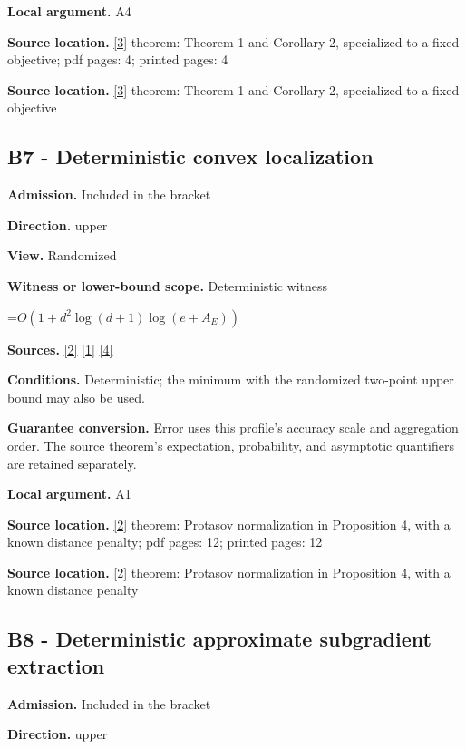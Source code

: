 \documentclass[10pt,a4paper]{article}
\newcommand{\AtlasMath}[1]{\par\begingroup\centering\setbox0=\hbox{$\displaystyle #1$}\ifdim\wd0>1.4\linewidth\typeout{ATLAS WIDE FORMULA: \the\wd0}\fi\ifdim\wd0>\linewidth\resizebox{\linewidth}{!}{\box0}\else\box0\fi\par\endgroup}
\begin{document}
\textbf{Local argument.} A4

\textbf{Source location.} \href{https://jmlr.org/papers/volume18/16-632/16-632.pdf}{[3]} theorem: Theorem 1 and Corollary 2, specialized to a fixed objective; pdf pages: 4; printed pages: 4

\textbf{Source location.} \href{https://jmlr.org/papers/volume18/16-632/16-632.pdf}{[3]} theorem: Theorem 1 and Corollary 2, specialized to a fixed objective

\subsection{B7 - Deterministic convex localization}
\textbf{Admission.} Included in the bracket

\textbf{Direction.} upper

\textbf{View.} Randomized

\textbf{Witness or lower-bound scope.} Deterministic witness

\AtlasMath{O(1+d^2\log(d+1)\log(e+A_E))}
\textbf{Sources.} \href{https://arxiv.org/html/2607.16558v2}{[2]} \href{https://arxiv.org/html/2610.00345v1}{[1]} \href{https://www.mathnet.ru/php/archive.phtml?jrnid=mzm&option_lang=eng&paperid=1697&wshow=paper}{[4]}

\textbf{Conditions.} Deterministic; the minimum with the randomized two-point upper bound may also be used.

\textbf{Guarantee conversion.} Error uses this profile's accuracy scale and aggregation order. The source theorem's expectation, probability, and asymptotic quantifiers are retained separately.

\textbf{Local argument.} A1

\textbf{Source location.} \href{https://arxiv.org/html/2607.16558v2}{[2]} theorem: Protasov normalization in Proposition 4, with a known distance penalty; pdf pages: 12; printed pages: 12

\textbf{Source location.} \href{https://arxiv.org/html/2607.16558v2}{[2]} theorem: Protasov normalization in Proposition 4, with a known distance penalty

\subsection{B8 - Deterministic approximate subgradient extraction}
\textbf{Admission.} Included in the bracket

\textbf{Direction.} upper
\end{document}
